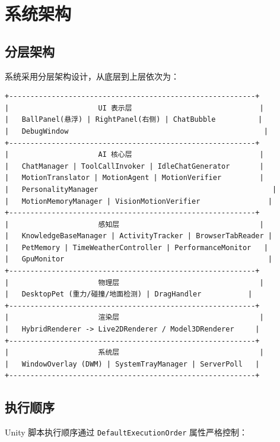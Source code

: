 \documentclass[12pt,a4paper]{ctexart}
\begin{document}
\section{系统架构}

\subsection{分层架构}

系统采用分层架构设计，从底层到上层依次为：

\begin{lstlisting}[frame=single,numbers=none,style=csharp]
+----------------------------------------------------------+
|                     UI 表示层                              |
|   BallPanel(悬浮) | RightPanel(右侧) | ChatBubble          |
|   DebugWindow                                              |
+----------------------------------------------------------+
|                     AI 核心层                              |
|   ChatManager | ToolCallInvoker | IdleChatGenerator       |
|   MotionTranslator | MotionAgent | MotionVerifier         |
|   PersonalityManager                                         |
|   MotionMemoryManager | VisionMotionVerifier                |
+----------------------------------------------------------+
|                     感知层                                 |
|   KnowledgeBaseManager | ActivityTracker | BrowserTabReader |
|   PetMemory | TimeWeatherController | PerformanceMonitor   |
|   GpuMonitor                                                |
+----------------------------------------------------------+
|                     物理层                                 |
|   DesktopPet (重力/碰撞/地面检测) | DragHandler           |
+----------------------------------------------------------+
|                     渲染层                                 |
|   HybridRenderer -> Live2DRenderer / Model3DRenderer     |
+----------------------------------------------------------+
|                     系统层                                 |
|   WindowOverlay (DWM) | SystemTrayManager | ServerPoll   |
+----------------------------------------------------------+
\end{lstlisting}

\subsection{执行顺序}

Unity 脚本执行顺序通过 \texttt{DefaultExecutionOrder} 属性严格控制：
\end{document}
